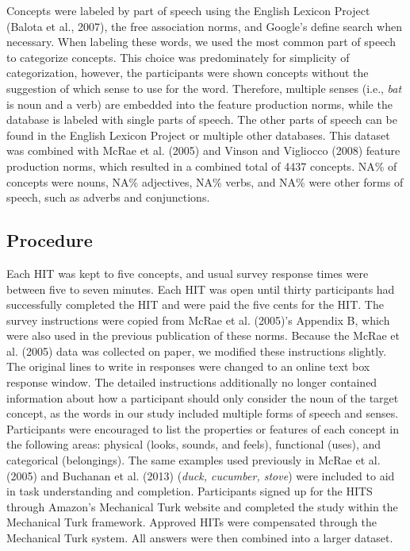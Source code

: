 \documentclass[english,,man]{apa6}
\theoremstyle{definition}
\theoremstyle{definition}
\theoremstyle{definition}
\theoremstyle{remark}
\begin{document}
Concepts were labeled by part of speech using the English Lexicon
Project (Balota et al., 2007), the free association norms, and Google's
define search when necessary. When labeling these words, we used the
most common part of speech to categorize concepts. This choice was
predominately for simplicity of categorization, however, the
participants were shown concepts without the suggestion of which sense
to use for the word. Therefore, multiple senses (i.e., \emph{bat} is
noun and a verb) are embedded into the feature production norms, while
the database is labeled with single parts of speech. The other parts of
speech can be found in the English Lexicon Project or multiple other
databases. This dataset was combined with McRae et al. (2005) and Vinson
and Vigliocco (2008) feature production norms, which resulted in a
combined total of 4437 concepts. NA\% of concepts were nouns, NA\%
adjectives, NA\% verbs, and NA\% were other forms of speech, such as
adverbs and conjunctions.

\hypertarget{procedure}{%
\subsection{Procedure}\label{procedure}}

Each HIT was kept to five concepts, and usual survey response times were
between five to seven minutes. Each HIT was open until thirty
participants had successfully completed the HIT and were paid the five
cents for the HIT. The survey instructions were copied from McRae et al.
(2005)'s Appendix B, which were also used in the previous publication of
these norms. Because the McRae et al. (2005) data was collected on
paper, we modified these instructions slightly. The original lines to
write in responses were changed to an online text box response window.
The detailed instructions additionally no longer contained information
about how a participant should only consider the noun of the target
concept, as the words in our study included multiple forms of speech and
senses. Participants were encouraged to list the properties or features
of each concept in the following areas: physical (looks, sounds, and
feels), functional (uses), and categorical (belongings). The same
examples used previously in McRae et al. (2005) and Buchanan et al.
(2013) (\emph{duck, cucumber, stove}) were included to aid in task
understanding and completion. Participants signed up for the HITS
through Amazon's Mechanical Turk website and completed the study within
the Mechanical Turk framework. Approved HITs were compensated through
the Mechanical Turk system. All answers were then combined into a larger
dataset.
\end{document}
